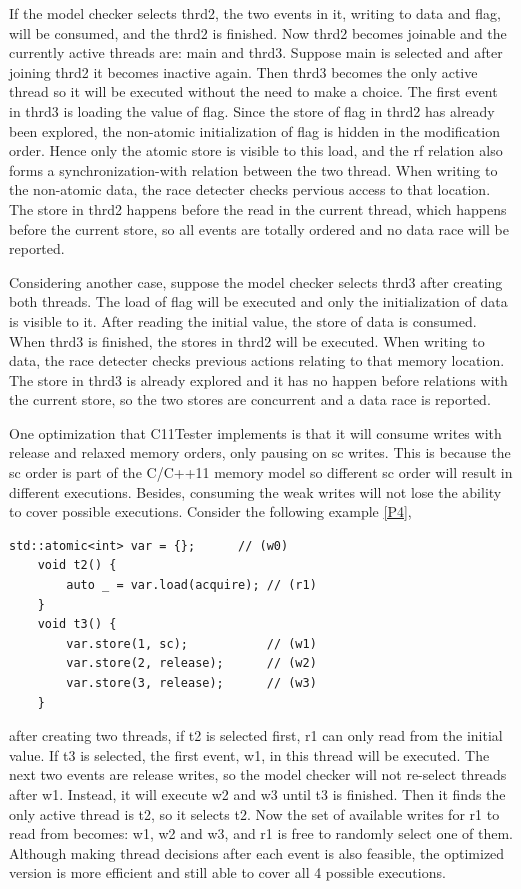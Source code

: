 If the model checker selects thrd2, the two events in it, writing to data and flag, will be consumed, and the thrd2 is finished. Now thrd2 becomes joinable and the currently active threads are: main and thrd3. Suppose main is selected and after joining thrd2 it becomes inactive again. Then thrd3 becomes the only active thread so it will be executed without the need to make a choice. The first event in thrd3 is loading the value of flag. Since the store of flag in thrd2 has already been explored, the non-atomic initialization of flag is hidden in the modification order. Hence only the atomic store is visible to this load, and the rf relation also forms a synchronization-with relation between the two thread. When writing to the non-atomic data, the race detecter checks pervious access to that location. The store in thrd2 happens before the read in the current thread, which happens before the current store, so all events are totally ordered and no data race will be reported.

Considering another case, suppose the model checker selects thrd3 after creating both threads. The load of flag will be executed and only the initialization of data is visible to it. After reading the initial value, the store of data is consumed. When thrd3 is finished, the stores in thrd2 will be executed. When writing to data, the race detecter checks previous actions relating to that memory location. The store in thrd3 is already explored and it has no happen before relations with the current store, so the two stores are concurrent and a data race is reported.

One optimization that C11Tester implements is that it will consume writes with release and relaxed memory orders, only pausing on sc writes. This is because the sc order is part of the C/C++11 memory model so different sc order will result in different executions. Besides, consuming the weak writes will not lose the ability to cover possible executions. Consider the following example  \ref{P4},
\begin{lstlisting}[caption={P4}, label={P4}]
    std::atomic<int> var = {};      // (w0)
    void t2() {
        auto _ = var.load(acquire); // (r1)
    }
    void t3() {
        var.store(1, sc);           // (w1)
        var.store(2, release);      // (w2)
        var.store(3, release);      // (w3)
    }
\end{lstlisting}
after creating two threads, if t2 is selected first, r1 can only read from the initial value. If t3 is selected, the first event, w1, in this thread will be executed. The next two events are release writes, so the model checker will not re-select threads after w1. Instead, it will execute w2 and w3 until t3 is finished. Then it finds the only active thread is t2, so it selects t2. Now the set of available writes for r1 to read from becomes: w1, w2 and w3, and r1 is free to randomly select one of them. Although making thread decisions after each event is also feasible, the optimized version is more efficient and still able to cover all 4 possible executions.

